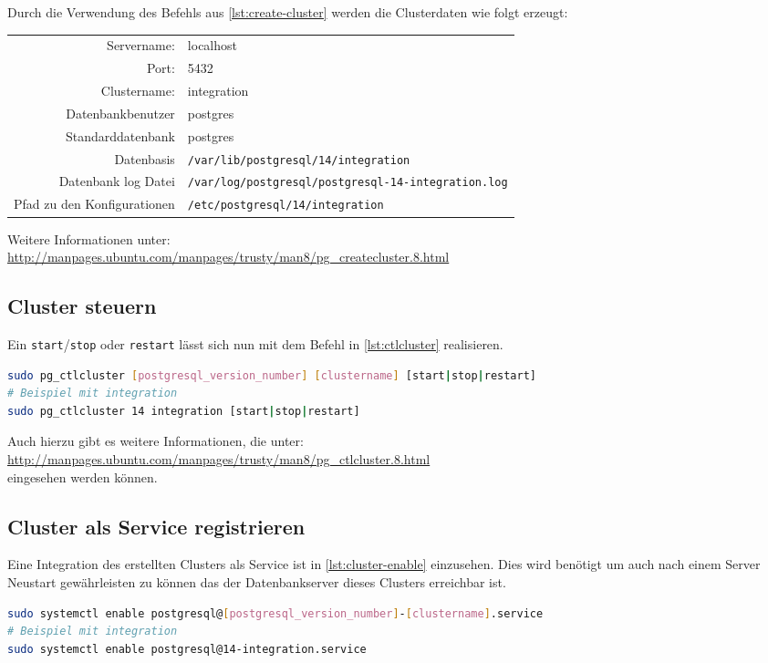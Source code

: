 Durch die Verwendung des Befehls aus \autoref{lst:create-cluster} werden die Clusterdaten wie folgt erzeugt:\\[0.5cm]
\begin{tabular}{r l}
	Servername: & localhost\\
	Port: & 5432\\
	Clustername: & integration\\
	Datenbankbenutzer & postgres\\
	Standarddatenbank & postgres\\
	Datenbasis & \lstinline[language=bash]|/var/lib/postgresql/14/integration|\\
	Datenbank log Datei & \lstinline[language=bash]|/var/log/postgresql/postgresql-14-integration.log|\\
	Pfad zu den Konfigurationen & \lstinline[language=bash]|/etc/postgresql/14/integration|\\
\end{tabular}\vspace{0.5cm}

Weitere Informationen unter:\\ \url{http://manpages.ubuntu.com/manpages/trusty/man8/pg_createcluster.8.html}\\[0.5cm]

\subsection{Cluster steuern}
Ein \lstinline[language=bash]|start|/\lstinline[language=bash]|stop| oder \lstinline[language=bash]|restart| lässt sich nun mit dem Befehl in \autoref{lst:ctlcluster} realisieren.
\begin{lstlisting}[language=bash,caption={Steuerung des Clusters},label={lst:ctlcluster}]
sudo pg_ctlcluster [postgresql_version_number] [clustername] [start|stop|restart]
# Beispiel mit integration
sudo pg_ctlcluster 14 integration [start|stop|restart]
\end{lstlisting}
Auch hierzu gibt es weitere Informationen, die unter:\\ \url{http://manpages.ubuntu.com/manpages/trusty/man8/pg_ctlcluster.8.html}\\
eingesehen werden können.\newpage

\subsection{Cluster als Service registrieren}
Eine Integration des erstellten Clusters\cite{postgresql-cluster} als Service ist in \autoref{lst:cluster-enable} einzusehen. Dies wird benötigt um auch nach einem Server Neustart gewährleisten zu können das der Datenbankserver dieses Clusters\cite{postgresql-cluster} erreichbar ist.
\begin{lstlisting}[language=bash,caption={Registierung des Clusters als System Service},label={lst:cluster-enable}]
sudo systemctl enable postgresql@[postgresql_version_number]-[clustername].service
# Beispiel mit integration
sudo systemctl enable postgresql@14-integration.service
\end{lstlisting}

